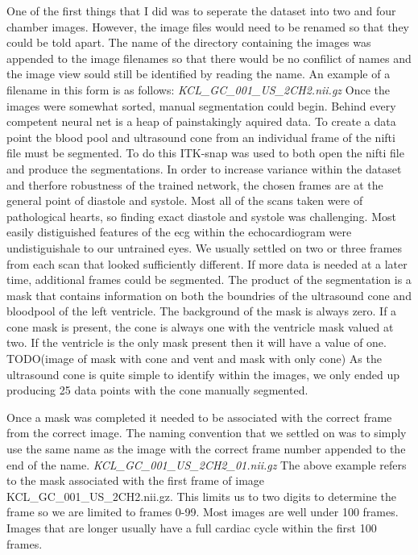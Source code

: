 \documentclass{article}
\begin{document}
{One of the first things that I did was to seperate the dataset into two and four chamber images. However, the image files would need to be renamed so that they could be told apart.
The name of the directory containing the images was appended to the image filenames so that there would be no confilict of names and the image view sould still be identified by reading the name.
An example of a filename in this form is as follows:
\textit{KCL\_GC\_001\_US\_2CH2.nii.gz}
Once the images were somewhat sorted, manual segmentation could begin. Behind every competent neural net is a heap of painstakingly aquired data.
To create a data point the blood pool and ultrasound cone from an individual frame of the nifti file must be segmented. To do this ITK-snap was used to both open the nifti file and produce the segmentations.
In order to increase variance within the dataset and therfore robustness of the trained network, the chosen frames are at the general point of diastole and systole.
Most all of the scans taken were of pathological hearts, so finding exact diastole and systole was challenging.
Most easily distiguished features of the ecg within the echocardiogram were undistiguishale to our untrained eyes.
We usually settled on two or three frames from each scan that looked sufficiently different.
If more data is needed at a later time, additional frames could be segmented.
The product of the segmentation is a mask that contains information on both the boundries of the ultrasound cone and bloodpool of the left ventricle.
The background of the mask is always zero. If a cone mask is present, the cone is always one with the ventricle mask valued at two.
If the ventricle is the only mask present then it will have a value of one.
TODO(image of mask with cone and vent and mask with only cone)
As the ultrasound cone is quite simple to identify within the images, we only ended up producing 25 data points with the cone manually segmented.
\par{}
Once a mask was completed it needed to be associated with the correct frame from the correct image.
The naming convention that we settled on was to simply use the same name as the image with the correct frame number appended to the end of the name.
\textit{KCL\_GC\_001\_US\_2CH2\_01.nii.gz}
The above example refers to the mask associated with the first frame of image KCL\_GC\_001\_US\_2CH2.nii.gz.
This limits us to two digits to determine the frame so we are limited to frames 0-99.
Most images are well under 100 frames. Images that are longer usually have a full cardiac cycle within the first 100 frames.
}
\end{document}
